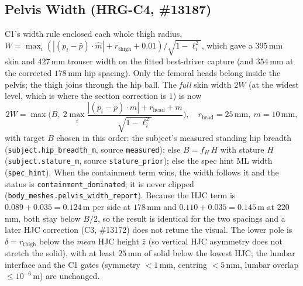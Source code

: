 \subsection{Pelvis Width (HRG-C4, \#13187)}
C1's width rule enclosed each whole thigh radius, $W=\max_i(|(p_i-\bar p)\!\cdot\!\hat m|
+ r_{\mathrm{thigh}}+0.01)/\sqrt{1-\ell_i^2}$, which gave a $395$\,mm skin and
$427$\,mm trouser width on the fitted best-driver capture (and $354$\,mm at the
corrected $178$\,mm hip spacing). Only the femoral heads belong inside the
pelvis; the thigh joins through the hip ball. The \emph{full} skin width
$2W$ (at the widest level, which is where the section correction is $1$) is now
\begin{equation}
2W=\max\bigl(B,\ 2\max_i\frac{|(p_i-\bar p)\cdot\hat m|+r_{\mathrm{head}}+m}
{\sqrt{1-\ell_i^2}}\bigr),\quad r_{\mathrm{head}}=25\,\mathrm{mm},\ m=10\,\mathrm{mm},
\end{equation}
with target $B$ chosen in this order: the subject's measured standing hip
breadth (\texttt{subject.hip\_breadth\_m}, source \texttt{measured}); else
$B=f_H\,H$ with stature $H$ (\texttt{subject.stature\_m}, source
\texttt{stature\_prior}); else the spec hint ML width (\texttt{spec\_hint}).
When the containment term wins, the width follows it and the status is
\texttt{containment\_dominated}; it is never clipped
(\texttt{body\_meshes.pelvis\_width\_report}). Because the HJC term is
$0.089+0.035=0.124$\,m per side at $178$\,mm and $0.110+0.035=0.145$\,m at $220$\,mm,
both stay below $B/2$, so the result is identical for the two spacings and a
later HJC correction (C3, \#13172) does not retune the visual. The lower pole is
$\delta=r_{\mathrm{thigh}}$ below the \emph{mean} HJC height $\bar z$ (so vertical
HJC asymmetry does not stretch the solid), with at least $25$\,mm of solid below
the lowest HJC; the lumbar interface and the C1 gates (symmetry $<1$\,mm,
centring $<5$\,mm, lumbar overlap $\le10^{-6}$\,m) are unchanged.

